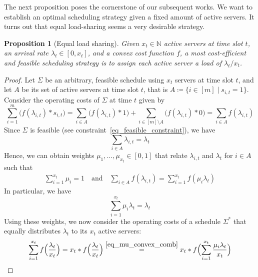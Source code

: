 \documentclass[hidelinks]{article}
\theoremstyle{plain}
\newtheorem{prop}[thm]{Proposition}
\theoremstyle{definition}
\theoremstyle{rem}
\begin{document}
The next proposition poses the cornerstone of our subsequent works. We want to establish an optimal scheduling strategy given a fixed amount of active servers. It turns out that equal load-sharing seems a very desirable strategy.
\begin{prop}[Equal load sharing]\label{prop_equ_load_sharing}
Given $x_t\in\mathbb{N}$ active servers at time slot $t$, an arrival rate $\lambda_t\in[0,x_t]$, and a convex cost function $f$, a most cost-efficient and feasible scheduling strategy is to assign each active server a load of $\lambda_t/x_t$.
\end{prop}
\begin{proof}
Let $\Sigma$ be an arbitrary, feasible schedule using $x_t$ servers at time slot $t$, and let $A$ be its set of active servers at time slot $t$, that is $A\coloneqq\{i\in[m]\mid s_{i,t}=1\}$.
Consider the operating costs of $\Sigma$ at time $t$ given by
\begin{equation*}
	\sum\limits_{i=1}^{m}\bigl(f(\lambda_{i,t})*s_{i,t}\bigr)=\sum\limits_{i\in A}\bigl(f(\lambda_{i,t})*1\bigr)+\sum\limits_{i\in [m]\setminus A}\bigl(f(\lambda_{i,t})*0\bigr)=\sum\limits_{i\in A}f(\lambda_{i,t})
\end{equation*}
Since $\Sigma$ is feasible (see constraint~\eqref{eq_feasible_constraint}), we have 
\begin{equation*}
	\sum\limits_{i\in A}\lambda_{i,t}=\lambda_t
\end{equation*}
Hence, we can obtain weights $\mu_1,\ldots,\mu_{x_t}\in[0,1]$ that relate $\lambda_{i,t}$ and $\lambda_t$ for $i\in A$ such that
\begin{align}
	\sum\limits_{i=1}^{x_t}\mu_i=1\quad\text{and}\quad \sum\limits_{i\in A}f(\lambda_{i,t})=\sum\limits_{i=1}^{x_t}f(\mu_i\lambda_t)\label{eq_mu_lambda_costs}
\end{align}
In particular, we have 
\begin{equation}
	\sum_{i=1}^{x_t}\mu_i\lambda_t=\lambda_t\label{eq_mu_convex_comb}
\end{equation}
Using these weights, we now consider the operating costs of a schedule $\Sigma^*$ that equally distributes $\lambda_t$ to its $x_t$ active servers:
\begin{align*}
	\sum\limits_{i=1}^{x_t}f\Bigl(\frac{\lambda_t}{x_t}\Bigr)=x_t*f\Bigl(\frac{\lambda_t}{x_t}\Bigr)\stackrel{\eqref{eq_mu_convex_comb}}{=}x_t*f\Bigl(\sum\limits_{i=1}^{x_t}{\frac{\mu_i\lambda_t}{x_t}}\Bigr)
\end{align*}

\end{proof}
\end{document}
